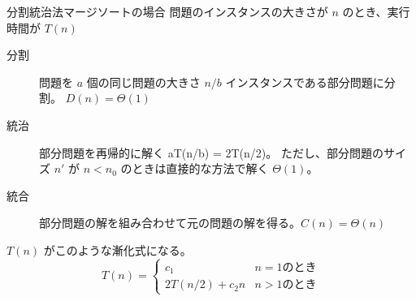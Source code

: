 \documentclass[unicode,11pt,aspectratio=169,notes]{beamer} %
\begin{document}

\begin{frame}{分割統治法}{マージソートの場合}
  問題のインスタンスの大きさが $n$ のとき、実行時間が \alert{$T(n)$}
  \begin{description}
    \item[分割] 問題を $a$ 個の同じ問題の大きさ $n/b$ インスタンスである部分問題に分割。
    \alert{$D(n) = \Theta(1)$}
    \item[統治] 部分問題を再帰的に解く \alert{aT(n/b) = 2T(n/2)}。
    ただし、部分問題のサイズ $n'$ が $n < n_0$ のときは直接的な方法で解く \alert{$\Theta(1)$}。
    \item[統合] 部分問題の解を組み合わせて元の問題の解を得る。\alert{$C(n) = \Theta(n)$}
  \end{description}

  \alert{$T(n)$} がこのような漸化式になる。
  \[
    T(n) = 
    \begin{cases}
      c_1 & n = 1 \text{のとき} \\
      2T(n/2) + c_2n & n > 1 \text{のとき}
    \end{cases}
  \]
\end{frame}

\end{document}
